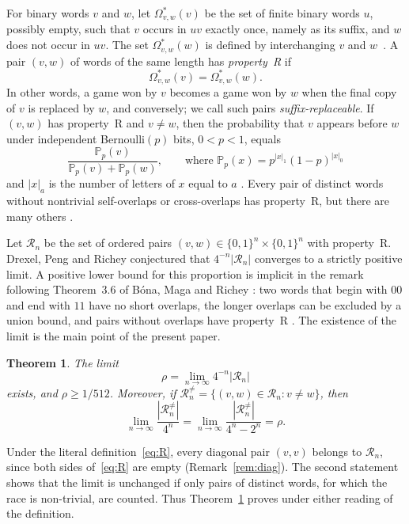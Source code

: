 \documentclass[11pt]{amsart}
\newtheorem{theorem}{Theorem}[section]
\theoremstyle{remark}
\numberwithin{equation}{section}
\newcommand{\Os}{\Omega^{*}}
\newcommand{\R}{\mathcal{R}}
\newcommand{\PP}{\mathbb{P}}
\newcommand{\bits}{\{0,1\}}
\begin{document}
For binary words $v$ and $w$, let $\Os_{v,w}(v)$ be the set of finite binary words $u$, possibly empty, such that $v$ occurs in $uv$ exactly once, namely as its suffix, and $w$ does not occur in $uv$. The set $\Os_{v,w}(w)$ is defined by interchanging $v$ and $w$~\cite[Definition~2]{DPR}. A pair $(v,w)$ of words of the same length has \emph{property~R} if
\begin{equation}\label{eq:R}
  \Os_{v,w}(v)=\Os_{v,w}(w).
\end{equation}
In other words, a game won by $v$ becomes a game won by $w$ when the final copy of $v$ is replaced by $w$, and conversely; we call such pairs \emph{suffix-replaceable}. If $(v,w)$ has property~R and $v\neq w$, then the probability that $v$ appears before $w$ under independent Bernoulli$(p)$ bits, $0<p<1$, equals
\[
  \frac{\PP_p(v)}{\PP_p(v)+\PP_p(w)},\qquad\text{where } \PP_p(x)=p^{|x|_1}(1-p)^{|x|_0}
\]
and $|x|_a$ is the number of letters of $x$ equal to $a$ \cite[Theorem~13]{DPR}. Every pair of distinct words without nontrivial self-overlaps or cross-overlaps has property~R, but there are many others \cite[p.~8]{DPR}.

Let $\R_n$ be the set of ordered pairs $(v,w)\in\bits^n\times\bits^n$ with property~R. Drexel, Peng and Richey conjectured \cite[Conjecture~14]{DPR} that $4^{-n}|\R_n|$ converges to a strictly positive limit. A positive lower bound for this proportion is implicit in the remark following Theorem~3.6 of Bóna, Maga and Richey \cite[p.~10]{BMR}: two words that begin with $00$ and end with $11$ have no short overlaps, the longer overlaps can be excluded by a union bound, and pairs without overlaps have property~R \cite[p.~8]{DPR}. The existence of the limit is the main point of the present paper.

\begin{theorem}\label{thm:main}
The limit
\[
  \rho=\lim_{n\to\infty}4^{-n}|\R_n|
\]
exists, and $\rho\ge 1/512$. Moreover, if $\R_n^{\neq}=\{(v,w)\in\R_n: v\neq w\}$, then
\[
  \lim_{n\to\infty}\frac{|\R_n^{\neq}|}{4^n}=\lim_{n\to\infty}\frac{|\R_n^{\neq}|}{4^n-2^n}=\rho .
\]
\end{theorem}

Under the literal definition~\eqref{eq:R}, every diagonal pair $(v,v)$ belongs to $\R_n$, since both sides of~\eqref{eq:R} are empty (Remark~\ref{rem:diag}). The second statement shows that the limit is unchanged if only pairs of distinct words, for which the race is non-trivial, are counted. Thus Theorem~\ref{thm:main} proves \cite[Conjecture~14]{DPR} under either reading of the definition.
\end{document}
